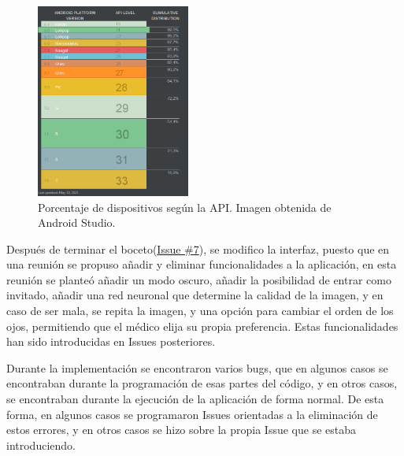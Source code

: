         \begin{figure}[!ht]
                 \centering
                 \includegraphics[width=0.45\textwidth]{img/API-android.png}
                  \caption{Porcentaje de dispositivos según la API. Imagen obtenida de Android Studio.}
                 \label{fig:API-Android}
        \end{figure}

Después de terminar el boceto(\href{https://github.com/mfg1014/Retinopatia-diabetica/issues/7}{Issue \#7}), se modifico la interfaz, puesto que en una reunión se propuso añadir y eliminar funcionalidades a la aplicación, en esta reunión se planteó añadir un modo oscuro, añadir la posibilidad de entrar como invitado, añadir una red neuronal que determine la calidad de la imagen, y en caso de ser mala, se repita la imagen, y una opción para cambiar el orden de los ojos, permitiendo que el médico elija su propia preferencia. Estas funcionalidades han sido introducidas en Issues posteriores.

Durante la implementación se encontraron varios bugs, que en algunos casos se encontraban durante la programación de esas partes del código, y en otros casos, se encontraban durante la ejecución de la aplicación de forma normal. De esta forma, en algunos casos se programaron Issues orientadas a la eliminación de estos errores, y en otros casos se hizo sobre la propia Issue que se estaba introduciendo.

